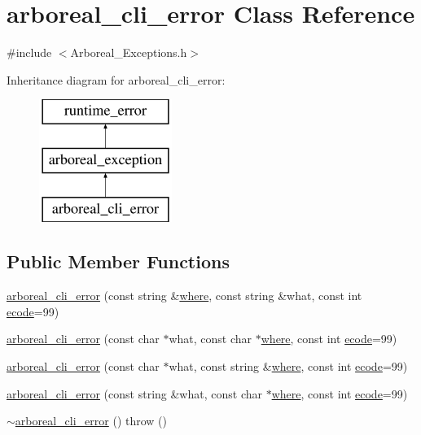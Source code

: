\hypertarget{classarboreal__cli__error}{}\section{arboreal\+\_\+cli\+\_\+error Class Reference}
\label{classarboreal__cli__error}


{\ttfamily \#include $<$Arboreal\+\_\+\+Exceptions.\+h$>$}

Inheritance diagram for arboreal\+\_\+cli\+\_\+error\+:\begin{figure}[H]
\begin{center}
\leavevmode
\includegraphics[height=4.000000cm]{classarboreal__cli__error}
\end{center}
\end{figure}
\subsection*{Public Member Functions}
\begin{DoxyCompactItemize}
\item 
\mbox{\hyperlink{classarboreal__cli__error_a39291e6c997b531c712892b9623f938a}{arboreal\+\_\+cli\+\_\+error}} (const string \&\mbox{\hyperlink{classarboreal__exception_a802003dee586aaeb0b0d7ce909da2dad}{where}}, const string \&what, const int \mbox{\hyperlink{classarboreal__exception_a318e716601c544d92ff9af25edebd725}{ecode}}=99)
\item 
\mbox{\hyperlink{classarboreal__cli__error_adecf3ae0818fcdff4d375ef12ea1659e}{arboreal\+\_\+cli\+\_\+error}} (const char $\ast$what, const char $\ast$\mbox{\hyperlink{classarboreal__exception_a802003dee586aaeb0b0d7ce909da2dad}{where}}, const int \mbox{\hyperlink{classarboreal__exception_a318e716601c544d92ff9af25edebd725}{ecode}}=99)
\item 
\mbox{\hyperlink{classarboreal__cli__error_ab9388ea7e89c5232d7dd43d00019fef6}{arboreal\+\_\+cli\+\_\+error}} (const char $\ast$what, const string \&\mbox{\hyperlink{classarboreal__exception_a802003dee586aaeb0b0d7ce909da2dad}{where}}, const int \mbox{\hyperlink{classarboreal__exception_a318e716601c544d92ff9af25edebd725}{ecode}}=99)
\item 
\mbox{\hyperlink{classarboreal__cli__error_a297adfc95de15ebdceae7cf364d05600}{arboreal\+\_\+cli\+\_\+error}} (const string \&what, const char $\ast$\mbox{\hyperlink{classarboreal__exception_a802003dee586aaeb0b0d7ce909da2dad}{where}}, const int \mbox{\hyperlink{classarboreal__exception_a318e716601c544d92ff9af25edebd725}{ecode}}=99)
\item 
\mbox{\hyperlink{classarboreal__cli__error_a12e8d9a35d700b944c62a9d232d464a1}{$\sim$arboreal\+\_\+cli\+\_\+error}} ()  throw ()
\end{DoxyCompactItemize}
